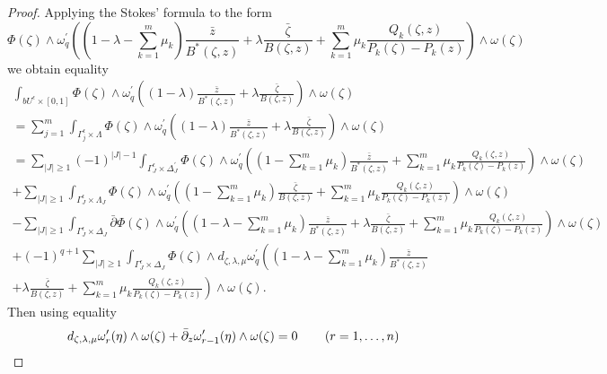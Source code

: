 \documentclass[11pt,reqno]{amsart}
\numberwithin{equation}{section}
\begin{document}
\begin{proof} Applying the Stokes' formula to the form
\begin{equation*}
\Phi(\zeta)\wedge\omega^{\prime}_q\left((1-\lambda-\sum_{k=1}^m\mu_k)
\frac{\bar z}{B^*(\zeta,z)}+\lambda\frac{\bar\zeta}{B(\zeta,z)}
+\sum_{k=1}^m\mu_k\frac{Q_k(\zeta,z)}{P_k(\zeta)-P_k(z)}\right)\wedge\omega(\zeta)
\end{equation*}
we obtain equality
\begin{multline*}
\int_{bU^{\epsilon}\times[0,1]}\Phi(\zeta)
\wedge\omega^{\prime}_q\left((1-\lambda)\frac{\bar z}
{B^*(\zeta,z)}+\lambda\frac{\bar\zeta}{B(\zeta,z)}\right)\wedge\omega(\zeta)\\
=\sum_{j=1}^m\int_{\Gamma^{\epsilon}_j\times\Lambda}\Phi(\zeta)
\wedge\omega^{\prime}_q\left((1-\lambda)\frac{\bar z}
{B^*(\zeta,z)}+\lambda\frac{\bar\zeta}{B(\zeta,z)}\right)\wedge\omega(\zeta)\\
=\sum_{|J|\geq 1}(-1)^{|J|-1}\int_{\Gamma^{\epsilon}_J\times\Delta^{\prime}_J}
\Phi(\zeta)\wedge\omega^{\prime}_q\left((1-\sum_{k=1}^m\mu_k)\frac{\bar z}{B^*(\zeta,z)}
+\sum_{k=1}^m\mu_k\frac{Q_k(\zeta,z)}{P_k(\zeta)-P_k(z)}\right)\wedge\omega(\zeta)\\
+\sum_{|J|\geq 1}\int_{\Gamma^{\epsilon}_J\times\Lambda_J}
\Phi(\zeta)\wedge\omega^{\prime}_q\left((1-\sum_{k=1}^m\mu_k)\frac{\bar\zeta}
{B(\zeta,z)}+\sum_{k=1}^m\mu_k\frac{Q_k(\zeta,z)}{P_k(\zeta)-P_k(z)}\right)
\wedge\omega(\zeta)\\
-\sum_{|J|\geq 1}\int_{\Gamma^{\epsilon}_J\times\Delta_J}
\bar\partial\Phi(\zeta)
\wedge\omega^{\prime}_q\left((1-\lambda-\sum_{k=1}^m\mu_k)\frac{\bar z}{B^*(\zeta,z)}
+\lambda\frac{\bar\zeta}{B(\zeta,z)}+\sum_{k=1}^m\mu_k\frac{Q_k(\zeta,z)}{P_k(\zeta)-P_k(z)}\right)
\wedge\omega(\zeta)\\
+(-1)^{q+1}\sum_{|J|\geq 1}\int_{\Gamma^{\epsilon}_J\times\Delta_J}
\Phi(\zeta)\wedge d_{\zeta,\lambda,\mu}
\omega^{\prime}_q\left((1-\lambda-\sum_{k=1}^m\mu_k)\frac{\bar z}{B^*(\zeta,z)}\right.\\
+\left.\lambda\frac{\bar\zeta}{B(\zeta,z)}+\sum_{k=1}^m\mu_k\frac{Q_k(\zeta,z)}{P_k(\zeta)-P_k(z)}\right)
\wedge\omega(\zeta).
\end{multline*}
\indent
Then using equality
\begin {equation}\label{domega}
d_{\zeta,\lambda,\mu}\omega^{\prime}_{r}(\eta)\wedge\omega(\zeta)
+ \bar\partial_z \omega^{\prime}_{r-1}(\eta)\wedge\omega(\zeta) = 0
\hspace{0.3in} (r=1,\dots,n)
\end{equation}

\end{proof}
\end{document}
